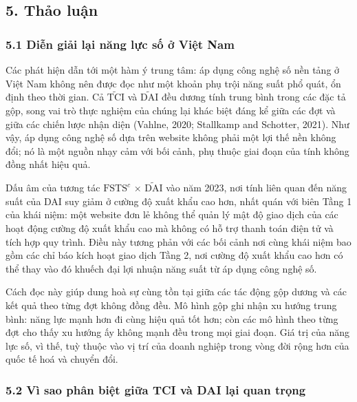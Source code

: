 \documentclass[12pt,a4paper]{article}
\begin{document}
\hypertarget{5-thux1ea3o-luux1eadn}{%
\subsection{5. Thảo luận}\label{5-thux1ea3o-luux1eadn}}

\hypertarget{51-diux1ec5n-giux1ea3i-lux1ea1i-nux103ng-lux1ef1c-sux1ed1-ux1edf-viux1ec7t-nam}{%
\subsubsection{5.1 Diễn giải lại năng lực số ở Việt
Nam}\label{51-diux1ec5n-giux1ea3i-lux1ea1i-nux103ng-lux1ef1c-sux1ed1-ux1edf-viux1ec7t-nam}}

Các phát hiện dẫn tới một hàm ý trung tâm: áp dụng công nghệ số nền tảng
ở Việt Nam không nên được đọc như một khoản phụ trội năng suất phổ quát,
ổn định theo thời gian. Cả \(\tilde{\mathrm{TCI}}\) và
\(\tilde{\mathrm{DAI}}\) đều dương tính trung bình trong các đặc tả gộp,
song vai trò thực nghiệm của chúng lại khác biệt đáng kể giữa các đợt và
giữa các chiến lược nhận diện (Vahlne, 2020; Stallkamp and Schotter,
2021). Như vậy, áp dụng công nghệ số dựa trên website không phải một lợi
thế nền không đổi; nó là một nguồn nhạy cảm với bối cảnh, phụ thuộc giai
đoạn của tính không đồng nhất hiệu quả.

Dấu âm của tương tác \(\mathrm{FSTS}^{c}\) × \(\tilde{\mathrm{DAI}}\)
vào năm 2023, nơi tính liên quan đến năng suất của DAI suy giảm ở cường
độ xuất khẩu cao hơn, nhất quán với biên Tầng 1 của khái niệm: một
website đơn lẻ không thể quản lý mật độ giao dịch của các hoạt động
cường độ xuất khẩu cao mà không có hỗ trợ thanh toán điện tử và tích hợp
quy trình. Điều này tương phản với các bối cảnh nơi cùng khái niệm bao
gồm các chỉ báo kích hoạt giao dịch Tầng 2, nơi cường độ xuất khẩu cao
hơn có thể thay vào đó khuếch đại lợi nhuận năng suất từ áp dụng công
nghệ số.

Cách đọc này giúp dung hoà sự cùng tồn tại giữa các tác động gộp dương
và các kết quả theo từng đợt không đồng đều. Mô hình gộp ghi nhận xu
hướng trung bình: năng lực mạnh hơn đi cùng hiệu quả tốt hơn; còn các mô
hình theo từng đợt cho thấy xu hướng ấy không mạnh đều trong mọi giai
đoạn. Giá trị của năng lực số, vì thế, tuỳ thuộc vào vị trí của doanh
nghiệp trong vòng đời rộng hơn của quốc tế hoá và chuyển đổi.

\hypertarget{52-vuxec-sao-phuxe2n-biux1ec7t-giux1eefa-tci-vuxe0-dai-lux1ea1i-quan-trux1ecdng}{%
\subsubsection{5.2 Vì sao phân biệt giữa TCI và DAI lại quan
trọng}\label{52-vuxec-sao-phuxe2n-biux1ec7t-giux1eefa-tci-vuxe0-dai-lux1ea1i-quan-trux1ecdng}}
\end{document}
